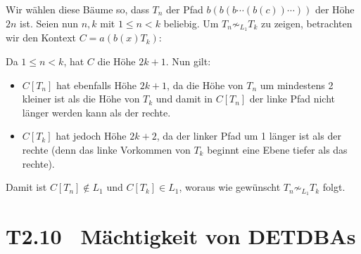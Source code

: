 \documentclass[fontsize=11pt, twoside=false, numbers=autoenddot]{scrbook}
\begin{document}
Wir wählen diese Bäume so, dass $T_n$ der Pfad $b(b(b\cdots (b(c)) \cdots ))$ der Höhe $2n$ ist.
Seien nun $n,k$ mit $1 \leq n < k$ beliebig.
Um $T_n \not\sim_{L_1} T_k$ zu zeigen,
betrachten wir den Kontext $C = a(b(x)T_k)$:
%
\vspace*{-\baselineskip}
\begin{center}
\end{center}
%
Da $1 \leq n < k$, hat $C$ die Höhe $2k+1$. Nun gilt:
%
\begin{itemize}
  \item
    $C[T_n]$ hat ebenfalls Höhe $2k+1$, da die Höhe von $T_n$ um mindestens 2 kleiner ist
    als die Höhe von $T_k$ und damit in $C[T_n]$ der linke Pfad nicht länger werden kann als der rechte.
  \item 
    $C[T_k]$ hat jedoch Höhe $2k+2$, da der linker Pfad um 1 länger ist als der rechte
    (denn das linke Vorkommen von $T_k$ beginnt eine Ebene tiefer als das rechte).
\end{itemize}
%
Damit ist $C[T_n] \notin L_1$ und $C[T_k] \in L_1$, woraus wie gewünscht $T_n \not\sim_{L_1} T_k$ folgt.

\section*{T2.10~ Mächtigkeit von DETDBAs}
\end{document}

